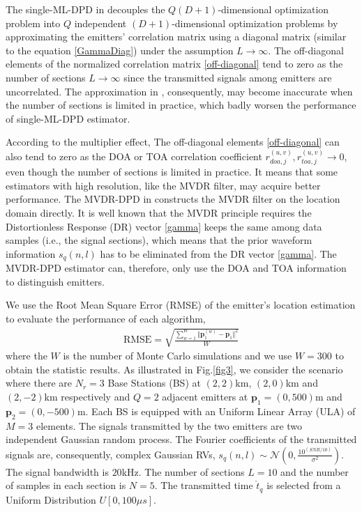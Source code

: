 \documentclass[review]{elsarticle}
\begin{document}
The single-ML-DPD in \cite{DPD2005} decouples the $Q(D+1)$-dimensional optimization problem into $Q$ independent $(D+1)$-dimensional optimization problems by approximating the emitters' correlation matrix  using a diagonal matrix (similar to the equation \eqref{GammaDiag}) under the assumption $L\to \infty$. The off-diagonal elements of the normalized correlation matrix \eqref{off-diagonal} tend to zero as the number of sections $L\to \infty$ since the transmitted signals among emitters are uncorrelated. The approximation in \cite{DPD2005}, consequently, may become inaccurate when the number of sections is limited in practice, which badly worsen the performance of single-ML-DPD estimator. 

According to the multiplier effect, The off-diagonal elements \eqref{off-diagonal} can also tend to zero as the DOA or TOA correlation coefficient $r_{doa,j}^{(u,v)}, r_{toa,j}^{(u,v)}\to 0$, even though the number of sections is limited in practice. It means that some estimators with high resolution, like the MVDR filter, may acquire better performance. The MVDR-DPD in \cite{Tirer2015High} constructs the MVDR filter on the location domain directly. It is well known that the MVDR principle requires the Distortionless Response (DR) vector \eqref{gamma} keeps the same among data samples (i.e., the signal sections), which means that the prior waveform information $s_q(n,l)$ has to be eliminated from the DR vector \eqref{gamma}. The MVDR-DPD estimator can, therefore, only use the DOA and TOA information to distinguish emitters. 

We use the Root Mean Square Error (RMSE) of the emitter's location estimation to evaluate the performance of each algorithm,
\begin{align}
    \text{RMSE}=\sqrt{\frac{\sum_{w=1}^W \Vert \boldsymbol{p}_1^{(w)}-\boldsymbol{p}_1\Vert ^2}{W}}
\end{align}
where the $W$ is the number of Monte Carlo simulations and we use $W=300$ to obtain the statistic results. 
As illustrated in Fig.\ref{fig3}, we consider the scenario where there are $N_r=3$ Base Stations (BS) at $(2,2)$km, $(2,0)$km and $(2,-2)$km respectively and $Q=2$ adjacent emitters at $\boldsymbol{p}_1=(0,500)$m and $\boldsymbol{p}_2=(0,-500)$m. Each BS is equipped with an Uniform Linear Array (ULA) of $M=3$ elements. The signals transmitted by the two emitters are two independent Gaussian random process. The Fourier coefficients of the transmitted signals are, consequently, complex Gaussian RVs, $s_q(n,l)\sim \mathcal{N}(0,\frac{10^{(SNR/10)}}{\sigma^2})$. The signal bandwidth is $20$kHz. The number of sections $L=10$ and the number of samples in each section is $N=5$. The transmitted time $\mathring{t}_q$ is selected from a Uniform Distribution $U[0,100\mu s]$.
\end{document}

